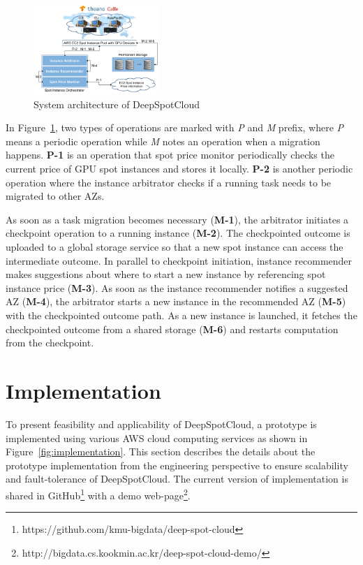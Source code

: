 \documentclass[conference]{IEEEtran}
\begin{document}
\begin{figure}
\centering\includegraphics[width=0.42\textwidth]{figures/architecture.pdf}\caption{\label{fig:architecture}System architecture of DeepSpotCloud}
\end{figure}

In Figure~\ref{fig:architecture}, two types of operations are marked with \textit{P} and \textit{M} prefix, where \textit{P} means a periodic operation while \textit{M} notes an operation when a migration happens. \textbf{P-1} is an operation that spot price monitor periodically checks the current price of GPU spot instances and stores it locally. \textbf{P-2} is another periodic operation where the instance arbitrator checks if a running task needs to be migrated to other AZs.

As soon as a task migration becomes necessary (\textbf{M-1}), the arbitrator initiates a checkpoint operation to a running instance (\textbf{M-2}). The checkpointed outcome is uploaded to a global storage service so that a new spot instance can access the intermediate outcome. In parallel to checkpoint initiation, instance recommender makes suggestions about where to start a new instance by referencing spot instance price (\textbf{M-3}). As soon as the instance recommender notifies a suggested AZ (\textbf{M-4}), the arbitrator starts a new instance in the recommended AZ (\textbf{M-5}) with the checkpointed outcome path. As a new instance is launched, it fetches the checkpointed outcome from a shared storage (\textbf{M-6}) and restarts computation from the checkpoint.

\section{Implementation}\label{sec:implementation}
To present feasibility and applicability of DeepSpotCloud, a prototype is implemented using various AWS cloud computing services as shown in Figure~\ref{fig:implementation}. This section describes the details about the prototype implementation from the engineering perspective to ensure scalability and fault-tolerance of DeepSpotCloud. The current version of implementation is shared in GitHub\footnote{https://github.com/kmu-bigdata/deep-spot-cloud} with a demo web-page\footnote{http://bigdata.cs.kookmin.ac.kr/deep-spot-cloud-demo/}.
\end{document}
